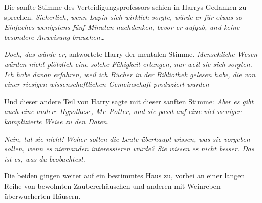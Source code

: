 Die sanfte Stimme des Verteidigungsprofessors schien in Harrys Gedanken zu sprechen.
\emph{Sicherlich, wenn Lupin sich wirklich sorgte, würde er für etwas so Einfaches wenigstens fünf Minuten nachdenken, bevor er aufgab, und keine besondere Anweisung brauchen…}

\emph{Doch, das würde er,} antwortete Harry der mentalen Stimme. \emph{Menschliche Wesen würden nicht plötzlich eine solche Fähigkeit erlangen, nur weil sie sich sorgten. Ich habe davon erfahren, weil ich Bücher in der Bibliothek gelesen habe, die von einer riesigen wissenschaftlichen Gemeinschaft produziert wurden}—

Und dieser andere Teil von Harry sagte mit dieser sanften Stimme: \emph{Aber es gibt auch eine andere Hypothese, Mr~Potter, und sie passt auf eine viel weniger komplizierte Weise zu den Daten.}


\emph{Nein, tut sie nicht! Woher sollen die Leute überhaupt wissen, was sie vorgeben sollen, wenn es niemanden interessieren würde? Sie wissen es nicht besser. Das ist es, was du beobachtest.}

Die beiden gingen weiter auf ein bestimmtes Haus zu, vorbei an einer langen Reihe von bewohnten Zaubererhäuschen und anderen mit Weinreben überwucherten Häusern.

